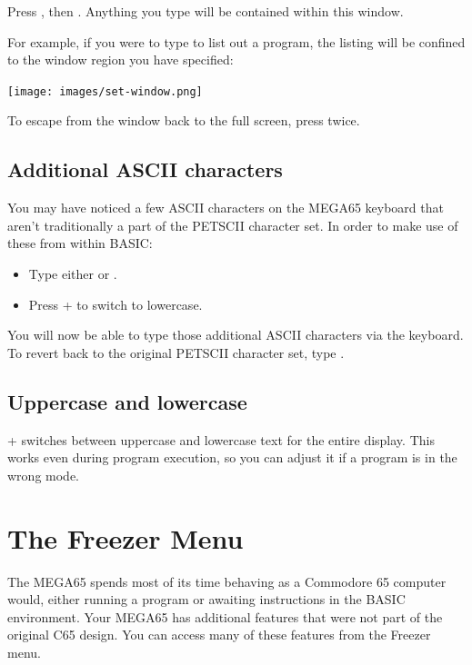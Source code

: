 Press , then . Anything you type will be contained within this window.

For example, if you were to type  to list out a program, the listing will be confined to the window region you have specified:

\begin{center}
\texttt{[image: images/set-window.png]}
\end{center}

To escape from the window back to the full screen, press  twice.

\subsection{Additional ASCII characters}

You may have noticed a few ASCII characters on the MEGA65 keyboard that aren't traditionally a part of the PETSCII character set. In order to make use of these from within BASIC:

\begin{itemize}
  \item Type either  or .
  \item Press \megasymbolkey +  to switch to lowercase.
\end{itemize}

You will now be able to type those additional ASCII characters via the keyboard. To revert back to the original PETSCII character set, type .

\subsection{Uppercase and lowercase}

\megasymbolkey +  switches between uppercase and lowercase text for the entire display. This works even during program execution, so you can adjust it if a program is in the wrong mode.


\section{The Freezer Menu}
\label{sec:freezer}
\nopagebreak
The MEGA65 spends most of its time behaving as a Commodore 65 computer would, either running a program or awaiting instructions in the BASIC environment. Your MEGA65 has additional features that were not part of the original C65 design. You can access many of these features from the Freezer menu.

